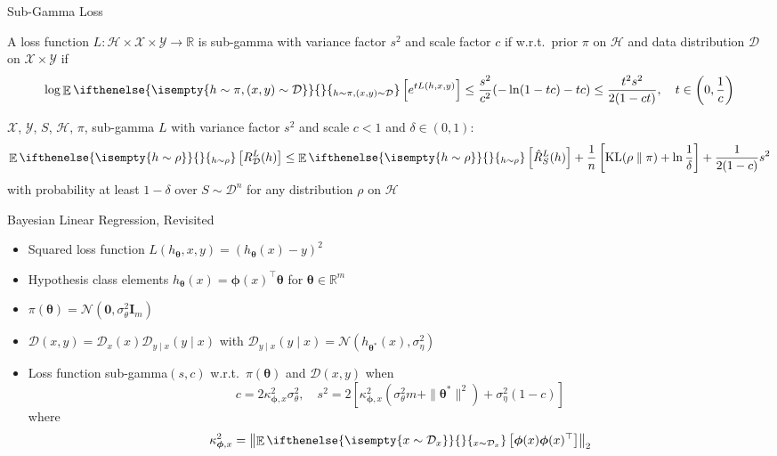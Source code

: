 \documentclass[aspectratio=169]{beamer}
\DeclareMathOperator*{\KLOp}{KL}
\DeclareMathOperator*{\EvOp}{\mathbb{E}}
\newcommand{\CD}{\mathcal{D}}
\newcommand{\CH}{\mathcal{H}}
\newcommand{\CX}{\mathcal{X}}
\newcommand{\CY}{\mathcal{Y}}
\newcommand{\RR}{\mathbb{R}}
\newcommand*{\KL}[2]{\KLOp(#1\parallel#2)}
\newcommand*{\Ev}[2][]{%
  \mathchoice{%
    \EvOp\ifthenelse{\isempty{#1}}{}{_{#1}}\left[#2\right]%
  }{%
    \EvOp\ifthenelse{\isempty{#1}}{}{_{#1}}[#2]%
  }{%
    \EvOp\ifthenelse{\isempty{#1}}{}{_{#1}}[#2]%
  }{%
    \EvOp\ifthenelse{\isempty{#1}}{}{_{#1}}[#2]%
  }%
}
\begin{document}
\begin{frame}{Sub-Gamma Loss}
  \begin{definition}
    A loss function $L : \CH \times \CX \times \CY \to \RR$ is sub-gamma with
    variance factor $s^2$ and scale factor $c$ if w.r.t.\ prior $\pi$ on $\CH$
    and data distribution $\CD$ on $\CX \times \CY$ if
    \begin{equation*}
      \log \Ev[h \sim \pi, (x, y) \sim \CD]{e^{t L(h, x, y)}} \leq
      \frac{s^2}{c^2}(-\ln(1 - t c) - t c) \leq \frac{t^2 s^2}{2 (1 - c t)},
      \quad t \in \left(0, \frac{1}{c}\right)
    \end{equation*}
  \end{definition}
  \begin{corollary}
    $\CX$, $\CY$, $S$, $\CH$, $\pi$, sub-gamma $L$ with variance factor $s^2$
    and scale $c < 1$ and $\delta \in (0, 1)$:
    \begin{equation*}
      \Ev[h \sim \rho]{R_\CD^L(h)} \leq \Ev[h \sim \rho]{\hat{R}_S^L(h)} +
      \frac{1}{n} \left[\KL{\rho}{\pi} + \ln\frac{1}{\delta}\right] + \frac{1}{2
      (1 - c)} s^2
    \end{equation*}
    with probability at least $1 - \delta$ over $S \sim \CD^n$ for any
    distribution $\rho$ on $\CH$
  \end{corollary}
\end{frame}

\begin{frame}{Bayesian Linear Regression, Revisited}
  \begin{itemize}
    \item
      Squared loss function $L(h_{\bm{\theta}}, x, y) = (h_{\bm{\theta}}(x) -
      y)^2$
    \item
      Hypothesis class elements $h_{\bm{\theta}}(x) = \bm{\phi}(x)^\top
      \bm{\theta}$ for $\bm{\theta} \in \RR^m$
    \item
      $\pi(\bm{\theta}) = \mathcal{N}(\bm{0}, \sigma_\theta^2
      \mathbf{I}_m)$
    \item
      $\CD(x, y) = \CD_x(x) \CD_{y \mid x}(y \mid x)$ with
      $\CD_{y \mid x}(y \mid x) = \mathcal{N}(h_{\bm{\theta}^*}(x),
      \sigma_\eta^2)$
    \item
      Loss function sub-gamma$(s, c)$ w.r.t.\ $\pi(\bm{\theta})$ and $\CD(x, y)$
      when
      \begin{equation*}
        c = 2 \kappa_{\bm{\phi},x}^2 \sigma_\theta^2, \quad s^2 = 2
        [\kappa_{\bm{\phi},x}^2 (\sigma_\theta^2 m + \| \bm{\theta}^* \|^2) +
        \sigma_\eta^2 (1 - c)] 
      \end{equation*}
      where
      \begin{equation*}
        \kappa_{\bm{\phi},x}^2 = \left\| \Ev[x \sim \CD_x]{\bm{\phi}(x)
        \bm{\phi}(x)^\top} \right\|_2
      \end{equation*}
  \end{itemize}
\end{frame}
\end{document}
